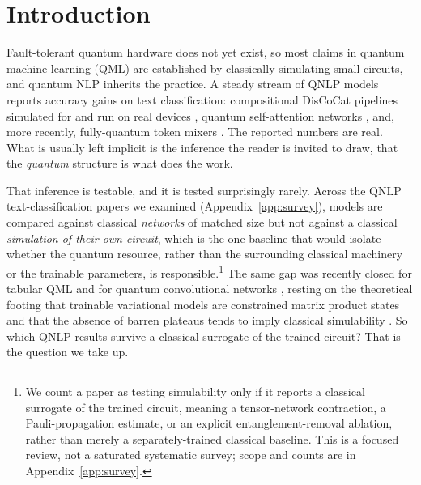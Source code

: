 \documentclass[10pt]{article}
\begin{document}
\section{Introduction}
\label{sec:intro}
Fault-tolerant quantum hardware does not yet exist, so most claims in quantum machine learning
(QML) are established by classically simulating small circuits, and quantum NLP inherits the
practice. A steady stream of QNLP models reports accuracy gains on text classification:
compositional DisCoCat pipelines simulated for and run on real devices \citep{lorenz2021},
quantum self-attention networks \citep{li2022,chen2024}, and, more recently, fully-quantum token
mixers \citep{claqs2025}. The reported numbers are real. What is usually left implicit is the
inference the reader is invited to draw, that the \emph{quantum} structure is what does the work.

That inference is testable, and it is tested surprisingly rarely. Across the QNLP
text-classification papers we examined (Appendix~\ref{app:survey}), models are compared against
classical \emph{networks} of matched size but not against a classical \emph{simulation of their
own circuit}, which is the one baseline that would isolate whether the quantum resource, rather
than the surrounding classical machinery or the trainable parameters, is responsible.\footnote{We
count a paper as testing simulability only if it reports a classical surrogate of the trained
circuit, meaning a tensor-network contraction, a Pauli-propagation estimate, or an explicit
entanglement-removal ablation, rather than merely a separately-trained classical baseline. This
is a focused review, not a saturated systematic survey; scope and counts are in
Appendix~\ref{app:survey}.} The same gap was recently closed for tabular QML \citep{bowles2024}
and for quantum convolutional networks \citep{bermejo2024}, resting on the theoretical footing
that trainable variational models are constrained matrix product states \citep{shin2024} and that
the absence of barren plateaus tends to imply classical simulability \citep{cerezo2025}. So which
QNLP results survive a classical surrogate of the trained circuit? That is the question we take up.
\end{document}
